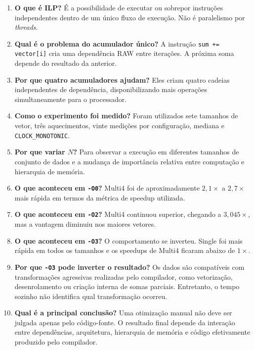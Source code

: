 \begin{enumerate}
    \item \textbf{O que é ILP?} É a possibilidade de executar ou sobrepor instruções
    independentes dentro de um único fluxo de execução. Não é paralelismo por
    \textit{threads}.

    \item \textbf{Qual é o problema do acumulador único?} A instrução
    \texttt{sum += vector[i]} cria uma dependência RAW entre iterações. A próxima soma
    depende do resultado da anterior.

    \item \textbf{Por que quatro acumuladores ajudam?} Eles criam quatro cadeias independentes
    de dependência, disponibilizando mais operações simultaneamente para o processador.

    \item \textbf{Como o experimento foi medido?} Foram utilizados sete tamanhos de vetor,
    três aquecimentos, vinte medições por configuração, mediana e
    \texttt{CLOCK\_MONOTONIC}.

    \item \textbf{Por que variar \(N\)?} Para observar a execução em diferentes tamanhos de
    conjunto de dados e a mudança de importância relativa entre computação e hierarquia de
    memória.

    \item \textbf{O que aconteceu em \texttt{-O0}?} Multi4 foi de aproximadamente
    \(2{,}1\times\) a \(2{,}7\times\) mais rápida em termos da métrica de speedup utilizada.

    \item \textbf{O que aconteceu em \texttt{-O2}?} Multi4 continuou superior, chegando a
    \(3{,}045\times\), mas a vantagem diminuiu nos maiores vetores.

    \item \textbf{O que aconteceu em \texttt{-O3}?} O comportamento se inverteu. Single foi
    mais rápida em todos os tamanhos e os speedups de Multi4 ficaram abaixo de \(1\times\).

    \item \textbf{Por que \texttt{-O3} pode inverter o resultado?} Os dados são compatíveis
    com transformações agressivas realizadas pelo compilador, como vetorização,
    desenrolamento ou criação interna de somas parciais. Entretanto, o tempo sozinho não
    identifica qual transformação ocorreu.

    \item \textbf{Qual é a principal conclusão?} Uma otimização manual não deve ser julgada
    apenas pelo código-fonte. O resultado final depende da interação entre dependências,
    arquitetura, hierarquia de memória e código efetivamente produzido pelo compilador.


\end{enumerate}
